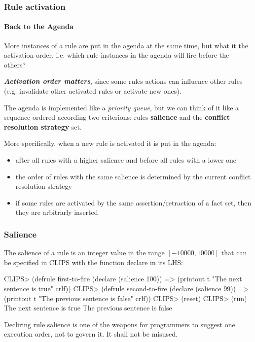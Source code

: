 \documentclass[xcolor={usenames,dvipsnames,svgnames}, compress]{beamer}
\begin{document}
\begin{frame}
  \frametitle{Rule activation}
  \framesubtitle{Back to the Agenda}
  More instances of a rule are put in the agenda at the same time, but
  what it the activation order, i.e. which rule instances in the
  agenda will fire before the others?\par\bigskip

  \textbf{\emph{Activation order matters}}, since some rules actions can influence
  other rules (e.g. invalidate other activated rules or activate new
  ones).\par\bigskip

  The agenda is implemented like a \emph{priority queue}, but we can
  think of it like a sequence ordered according two criterions: rules \textbf{salience}
  and the \textbf{conflict resolution strategy} set.\par\bigskip

  More specifically, when a new rule is activated it is put in the
  agenda:
  \begin{itemize}
  \item after all rules with a higher salience and before all rules
    with a lower one
    \item the order of rules with the same salience is determined by
      the current conflict resolution strategy
      \item if some rules are activated by the same
        assertion/retraction of a fact set, then they are arbitrarly inserted
  \end{itemize}

\end{frame}

\begin{frame}[fragile]
  \frametitle{Salience}
  The salience of a rule is an integer value in the range $[-10000, 10000]$ that can be specified in CLIPS with the function
  \textsf{declare} in its LHS:
  \begin{clips-code}
    CLIPS> (defrule first-to-fire
               (declare (salience 100))
               =>
               (printout t "The next sentence is true" crlf))
    CLIPS> (defrule second-to-fire
               (declare (salience 99))
               =>
               (printout t "The previous sentence is false" crlf))
    CLIPS> (reset)
    CLIPS> (run)
    The next sentence is true
    The previous sentence is false
  \end{clips-code}

  Decliring rule salience is one of the weapons for programmers to
  suggest one execution order, not to govern it. It shall not be misused.
\end{frame}
\end{document}

